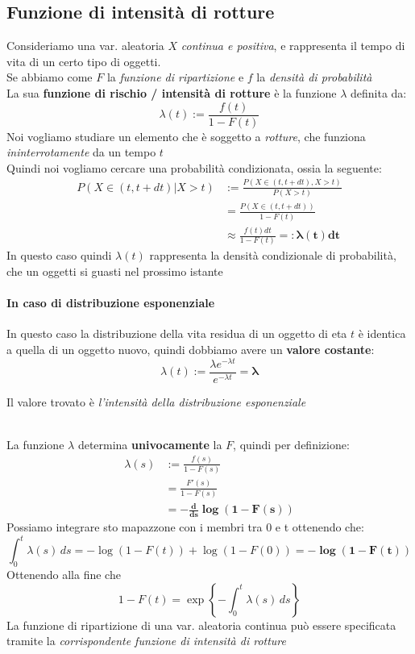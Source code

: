 \documentclass[]{article}
\begin{document}
    \subsection{Funzione di intensità di rotture}
    Consideriamo una var. aleatoria $X$ \textit{continua e positiva}, e rappresenta il tempo di vita di un certo tipo di oggetti. \\
    Se abbiamo come $F$ la \textit{funzione di ripartizione} e $f$ la \textit{densità di probabilità} \\
    La sua \textbf{funzione di rischio / intensità di rotture} è la funzione $\lambda$ definita da:
    \[ \lambda(t) := \frac{f(t)}{1 - F(t)} \]
    Noi vogliamo studiare un elemento che è soggetto a \textit{rotture}, che funziona \textit{ininterrotamente} da un tempo $t$ \\
    Quindi noi vogliamo cercare una probabilità condizionata, ossia la seguente:
    \begin{equation*}
        \begin{split}
            P(X \in (t, t+ dt) | X > t) &:= \frac{P(X \in (t,t+dt), X > t)}{P(X>t)} \\
            &= \frac{P(X \in (t,t+dt))}{1 -F(t)} \\
            &\approx \frac{f(t) dt}{1-F(t)} =: \boldsymbol{\lambda(t) dt}
        \end{split}
    \end{equation*}
    In questo caso quindi $\lambda(t)$ rappresenta la densità condizionale di probabilità, che un oggetti si guasti nel prossimo istante
    \paragraph{In caso di distribuzione esponenziale} In questo caso la distribuzione della vita residua di un oggetto di eta $t$ è identica a quella di un oggetto nuovo, quindi dobbiamo avere un \textbf{valore costante}:
    \[ \lambda(t) := \frac{\lambda e^{-\lambda t}}{e^{-\lambda t}} = \boldsymbol{\lambda} \]
    \centerline{Il valore trovato è \textit{l'intensità della distribuzione esponenziale}} \\[2ex]
    La funzione $\lambda$ determina \textbf{univocamente} la $F$, quindi per definizione:
    \begin{equation}
        \begin{split}
            \lambda(s) &:= \frac{f(s)}{1-F(s)} \\
            &= \frac{F'(s)}{1 - F(s)} \\
            &= \boldsymbol{- \frac{d}{ds} \log (1- F(s))}
        \end{split}
    \end{equation}
    Possiamo integrare sto mapazzone con i membri tra 0 e t ottenendo che:
    \[ \int_{0}^{t} \lambda(s) \, ds = - \log(1-F(t)) + \log (1-F(0)) = \boldsymbol{-\log (1-F(t))} \]
    Ottenendo alla fine che 
    \[ 1 - F(t) = \exp \left\{ - \int_{0}^{t} \lambda(s) \, ds \right\} \]
    La funzione di ripartizione di una var. aleatoria continua può essere specificata tramite la \textit{corrispondente funzione di intensità di rotture}
\end{document}
